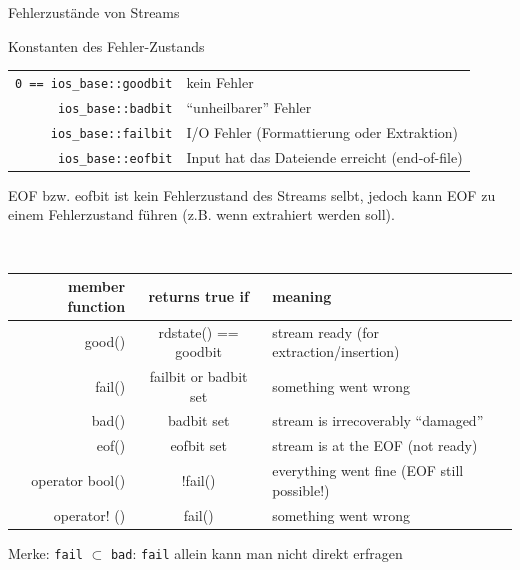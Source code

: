 \begin{frame}{Fehlerzustände von Streams}
	\footnotesize
	\begin{block}{Konstanten des Fehler-Zustands}
		\begin{tabular}{rl}
			\texttt{0 == ios\_base::goodbit}	&	kein Fehler	\\
			\texttt{ios\_base::badbit}			&	\enquote{unheilbarer} Fehler	\\
			\texttt{ios\_base::failbit}		&	I/O Fehler (Formattierung oder Extraktion)	\\
			\texttt{ios\_base::eofbit}			&	Input hat das Dateiende erreicht (end-of-file)	\\
		\end{tabular}
	\end{block}
	
	\pause
	
	EOF bzw. eofbit ist kein Fehlerzustand des Streams selbt, jedoch kann EOF zu einem Fehlerzustand führen (z.B. wenn extrahiert werden soll).
	
	\vspace{1em}
	
	{\tt
	\begin{tabular}{rcl}
		\textnormal{\textbf{member function}}	&	\textnormal{\textbf{returns true if}}&	\textnormal{\textbf{meaning}}\\
		\hline
		good()	&	rdstate() == goodbit	&	\textnormal{stream ready (for extraction/insertion)}	\\
		fail()	&	failbit \textnormal{or} badbit \textnormal{set}	&	\textnormal{something went wrong}	\\
		bad()	&	badbit \textnormal{set}	&	\textnormal{stream is irrecoverably \enquote{damaged}} \\
		eof()	&	eofbit \textnormal{set}	&	\textnormal{stream is at the EOF (not ready)}	\\
		operator bool()	&	!fail()	&	\textnormal{everything went fine (EOF still possible!)} \\
		operator! ()	&	fail()	&	\textnormal{something went wrong} \\
	\end{tabular}
	}
	
	\pause
	\vspace{1em}
	
	Merke: \texttt{fail} $\subset$ \texttt{bad}: \texttt{fail} allein kann man nicht direkt erfragen
\end{frame}


